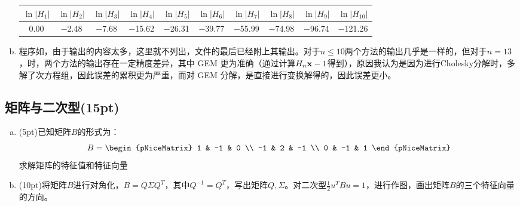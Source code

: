 \documentclass[12pt, a4paper, oneside]{article}
\begin{document}
\begin{enumerate}[(a)]
\begin{table}[htp]
\begin{tabular}{|c|c|c|c|c|c|c|c|c|c|}
    $\ln|H_1|$ & $\ln|H_2|$ & $\ln|H_3|$ & $\ln|H_4|$ & $\ln|H_5|$ & $\ln|H_6|$ & $\ln|H_7|$ & $\ln|H_8|$ & $\ln|H_9|$ & $\ln|H_{10}|$ \\
    \hline
    \num{0.00} & \num{-2.48} & \num{-7.68} & \num{-15.62} & \num{-26.31} & \num{-39.77} & \num{-55.99} & \num{-74.98} & \num{-96.74} & \num{-121.26}\\
    \hline
\end{tabular}
\end{table}
\item 程序如，由于输出的内容太多，这里就不列出，文件的最后已经附上其输出。对于$n\le 10$两个方法的输出几乎是一样的，但对于$n=13$，时，两个方法的输出存在一定精度差异，其中 GEM 更为准确（通过计算$H_n\textbf{x} - 1$得到），原因我认为是因为进行Cholesky分解时，多解了次方程组，因此误差的累积更为严重，而对 GEM 分解，是直接进行变换解得的，因此误差更小。
\end{enumerate}

\subsection{矩阵与二次型(15pt)}
\begin{enumerate}[(a)]
    \item (5pt)已知矩阵$B$的形式为：
    $$B = \begin{pNiceMatrix}
        1 & -1 & 0 \\ -1 & 2 & -1 \\ 0 & -1 & 1
    \end{pNiceMatrix}$$
    求解矩阵的特征值和特征向量
    \item (10pt)将矩阵$B$进行对角化，$B=Q\Sigma Q^T$，其中$Q^{-1} = Q^T$，写出矩阵$Q,\Sigma$。对二次型$\frac12u^TBu=1$，进行作图，画出矩阵$B$的三个特征向量的方向。
\end{enumerate}
\end{document}
